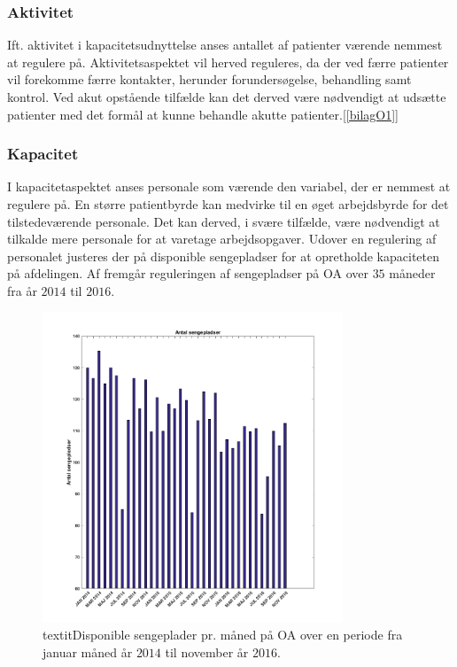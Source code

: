 \subsubsection{Aktivitet}
Ift. aktivitet i kapacitetsudnyttelse anses antallet af patienter værende nemmest at regulere på. Aktivitetsaspektet vil herved reguleres, da der ved færre patienter vil forekomme færre kontakter, herunder forundersøgelse, behandling samt kontrol. Ved akut opstående tilfælde kan det derved være nødvendigt at udsætte patienter med det formål at kunne behandle akutte patienter.[\ref{bilagO1}]


\subsubsection{Kapacitet}
I kapacitetaspektet anses personale som værende den variabel, der er nemmest at regulere på. En større patientbyrde kan medvirke til en øget arbejdsbyrde for det tilstedeværende personale. Det kan derved, i svære tilfælde, være nødvendigt at tilkalde mere personale for at varetage arbejdsopgaver. 
Udover en regulering af personalet justeres der på disponible sengepladser for at opretholde kapaciteten på afdelingen. Af  fremgår reguleringen af sengepladser på OA over $35$ måneder fra år $2014$ til $2016$.\cite{Bjerg2016}

\begin{figure}[H] 
\begin{center}
\includegraphics[width=0.8\textwidth]{figures/sengepladser}
\end{center}
\caption{textit{Disponible sengeplader pr. måned på OA over en periode fra januar måned år $2014$ til november år $2016$.}\cite{SDS2015}} 
\label{fig:sengepladser} 
\end{figure}

